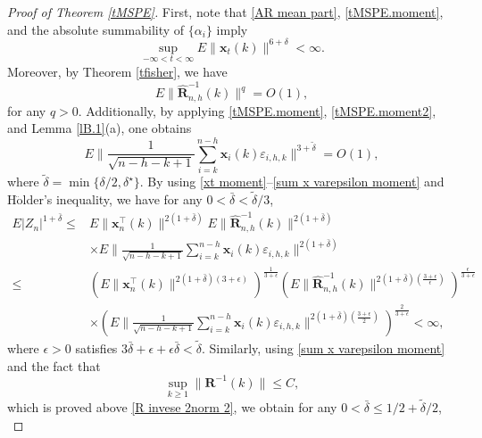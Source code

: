 \documentclass[ejsv2]{imsart}
\theoremstyle{plain}
\theoremstyle{definition}
\theoremstyle{remark}
\begin{document}
\begin{proof}[Proof of Theorem \ref{tMSPE}]
{First, note that \eqref{AR mean part}, \eqref{tMSPE.moment}, and the
absolute summability of $\{\alpha_i\}$ imply 
\begin{equation}\label{xt moment}
\sup\limits_{-\infty<t<\infty} E\lVert\mathbf{x}_t(k)\rVert^{6+\delta}<\infty.
\end{equation}
Moreover, by Theorem \ref{tfisher}, we have 
\begin{equation}\label{inverse sample autocovariance moment 2}
E\lVert\hat{\mathbf{R}}^{-1}_{n,h}(k)\rVert^{q}=O(1),
\end{equation}
for any $q>0$. Additionally, by applying \eqref{tMSPE.moment}, \eqref{tMSPE.moment2}, and Lemma \ref{lB.1}(a), one obtains
\begin{equation}\label{sum x varepsilon moment}
E\lVert\frac{1}{\sqrt{n-h-k+1}}\sum_{i=k}^{n-h}\mathbf{x}_i(k)\varepsilon_{i,h,k}\rVert^{3+\tilde{\delta}}= O(1),
\end{equation}
where $\tilde{\delta}=\min\{\delta/2,\delta^\star\}$. By using \eqref{xt moment}--\eqref{sum x varepsilon moment} and H$\ddot{\mathrm{o}}$lder's inequality, we have for any $0<\bar{\delta}<\tilde{\delta}/3$,
\begin{equation}\label{ptMSPE.1.1.02}
\begin{split}
 E|Z_n|^{1+\bar{\delta}}   \leq  & E\lVert\mathbf{x}^\top_n(k)\rVert^{2(1+\bar{\delta})}E\lVert\hat{\mathbf{R}}_{n,h}^{-1}(k)\rVert^{2(1+\bar{\delta})}\\
    &\times E\lVert\frac{1}{\sqrt{n-h-k+1}}\sum_{i=k}^{n-h}\mathbf{x}_i(k)\varepsilon_{i,h,k}\rVert^{2(1+\bar{\delta})}\\
    \leq & (E\lVert\mathbf{x}^\top_n(k)\rVert^{2(1+\bar{\delta})(3+\epsilon)})^{\frac{1}{3+\epsilon}}
    (E\lVert\hat{\mathbf{R}}_{n,h}^{-1}(k)\rVert^{2(1+\bar{\delta})(\frac{3+\epsilon}{\epsilon})})^{\frac{\epsilon}{3+\epsilon}}\\
    &\times
    (E\lVert\frac{1}{\sqrt{n-h-k+1}}\sum_{i=k}^{n-h}\mathbf{x}_i(k)\varepsilon_{i,h,k}\rVert^{2(1+\bar{\delta})(\frac{3+\epsilon}{2})})^{\frac{2}{3+\epsilon}}<\infty,
\end{split}
\end{equation}
where $\epsilon>0$ satisfies $3\bar{\delta}+\epsilon+\epsilon\bar{\delta}<\tilde{\delta}$. Similarly, using \eqref{sum x varepsilon moment} and the fact that
\begin{equation}\label{R invese 2norm}
\sup\limits_{k\geq1}\lVert\mathbf{R}^{-1}(k)\rVert\leq C,
\end{equation}
which is proved above \eqref{R invese 2norm 2}, we obtain for any $0<\bar{\delta}\leq1/2+\tilde{\delta}/2$,
}
\end{proof}
\end{document}

